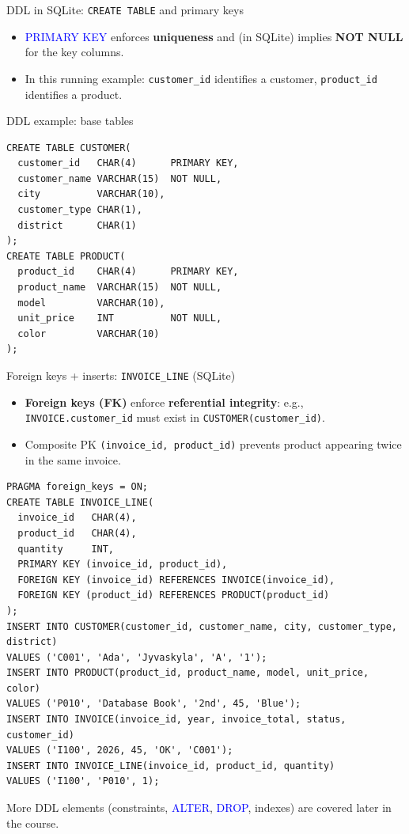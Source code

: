 \documentclass[10pt,aspectratio=169]{beamer}
\newcommand{\sqlk}[1]{\textcolor{blue}{#1}}
\begin{document}
\begin{frame}[fragile]{DDL in SQLite: \texttt{CREATE TABLE} and primary keys}
\small
\begin{itemize}
  \item \sqlk{PRIMARY KEY} enforces \textbf{uniqueness} and (in SQLite) implies \textbf{NOT NULL} for the key columns.
  \item In this running example: \texttt{customer\_id} identifies a customer, \texttt{product\_id} identifies a product.
\end{itemize}

\vspace{1mm}
\begin{block}{DDL example: base tables}
\end{block}
\begin{lstlisting}[style=sqlite,basicstyle=\footnotesize\ttfamily]
CREATE TABLE CUSTOMER(
  customer_id   CHAR(4)      PRIMARY KEY,
  customer_name VARCHAR(15)  NOT NULL,
  city          VARCHAR(10),
  customer_type CHAR(1),
  district      CHAR(1)
);
CREATE TABLE PRODUCT(
  product_id    CHAR(4)      PRIMARY KEY,
  product_name  VARCHAR(15)  NOT NULL,
  model         VARCHAR(10),
  unit_price    INT          NOT NULL,
  color         VARCHAR(10)
);
\end{lstlisting}
\end{frame}

\begin{frame}[fragile]{Foreign keys + inserts: \texttt{INVOICE\_LINE} (SQLite)}
\small
\begin{itemize}
  \item \textbf{Foreign keys (FK)} enforce \textbf{referential integrity}:
        e.g., \texttt{INVOICE.customer\_id} must exist in \texttt{CUSTOMER(customer\_id)}.
  \item Composite PK \texttt{(invoice\_id, product\_id)} prevents product appearing twice in the same invoice.
\end{itemize}
\vspace{1mm}

\begin{lstlisting}[style=sqlite,basicstyle=\scriptsize\ttfamily]
PRAGMA foreign_keys = ON;
CREATE TABLE INVOICE_LINE(
  invoice_id   CHAR(4),
  product_id   CHAR(4),
  quantity     INT,
  PRIMARY KEY (invoice_id, product_id),
  FOREIGN KEY (invoice_id) REFERENCES INVOICE(invoice_id),
  FOREIGN KEY (product_id) REFERENCES PRODUCT(product_id)
);
INSERT INTO CUSTOMER(customer_id, customer_name, city, customer_type, district)
VALUES ('C001', 'Ada', 'Jyvaskyla', 'A', '1');
INSERT INTO PRODUCT(product_id, product_name, model, unit_price, color)
VALUES ('P010', 'Database Book', '2nd', 45, 'Blue');
INSERT INTO INVOICE(invoice_id, year, invoice_total, status, customer_id)
VALUES ('I100', 2026, 45, 'OK', 'C001');
INSERT INTO INVOICE_LINE(invoice_id, product_id, quantity)
VALUES ('I100', 'P010', 1);
\end{lstlisting}
\vspace{1mm}
\footnotesize More DDL elements (constraints, \sqlk{ALTER}, \sqlk{DROP}, indexes) are covered later in the course.
\end{frame}
\end{document}
